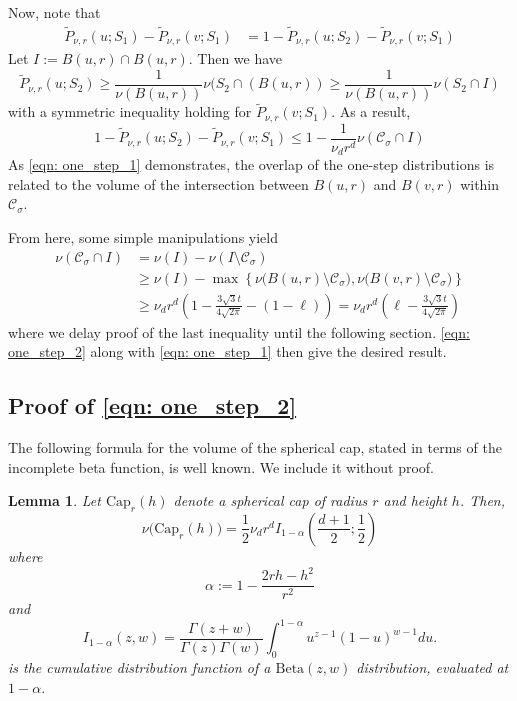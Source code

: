 \documentclass{article}
\newcommand{\set}[1]{\left\{#1\right\}}
\newcommand{\Cset}{\mathcal{C}}
\newcommand{\Csig}{\Cset_{\sigma}}
\newcommand{\1}{\mathbf{1}}
\theoremstyle{alden}
\theoremstyle{aldenthm}
\newtheorem{lemma}{Lemma}
\theoremstyle{remark}
\begin{document}
	Now, note that
	\begin{align*}
	\widetilde{P}_{\nu,r}(u; S_1) - \widetilde{P}_{\nu,r}(v; S_1) & = 1 - \widetilde{P}_{\nu,r}(u; S_2) - \widetilde{P}_{\nu,r}(v; S_1)
	\end{align*}
	Let $I := B(u,r) \cap B(u,r)$. Then we have
	\begin{equation*}
	\widetilde{P}_{\nu,r}(u; S_2) \geq \frac{1}{\nu(B(u,r))} \nu(S_2 \cap (B(u,r)) \geq \frac{1}{\nu(B(u,r))} \nu(S_2 \cap I)
	\end{equation*}
	with a symmetric inequality holding for $\widetilde{P}_{\nu,r}(v; S_1)$. As a result,
	\begin{equation}
	1 - \widetilde{P}_{\nu,r}(u; S_2) - \widetilde{P}_{\nu,r}(v; S_1) \leq 1 - \frac{1}{\nu_d r^d} \nu(\Csig \cap I) \label{eqn: one_step_1}
	\end{equation}
	As \eqref{eqn: one_step_1} demonstrates, the overlap of the one-step distributions is related to the volume of the intersection between $B(u,r)$ and $B(v,r)$ within $\Csig$.
	
	From here, some simple manipulations yield
	\begin{align}
	\nu(\Csig \cap I)  & = \nu(I) - \nu(I \setminus \Csig) \nonumber \\
	& \geq \nu(I) - \max \set{\nu\bigl(B(u,r) \setminus \Csig\bigr), \nu\bigl(B(v,r) \setminus \Csig\bigr)} \nonumber \\
	& \geq \nu_d r^d \left(1 - \frac{3 \sqrt{3} t}{4\sqrt{2\pi}} - (1 -\ell) \label{eqn: one_step_2} \right) = \nu_d r^d\left(\ell - \frac{3 \sqrt{3} t}{4\sqrt{2\pi}}\right)
	\end{align}
	where we delay proof of the last inequality until the following section. \eqref{eqn: one_step_2} along with \eqref{eqn: one_step_1} then give the desired result.

\subsection{Proof of \eqref{eqn: one_step_2}}
The following formula for the volume of the spherical cap, stated in terms of the incomplete beta function, is well known. We include it without proof. 
\begin{lemma}
	\label{lem: volume_of_spherical_cap}
	Let $\mathrm{Cap}_r(h)$ denote a spherical cap of radius $r$ and height $h$. Then, 
	\begin{equation*}
	\nu\bigl( \mathrm{Cap}_r(h)  \bigr) = \frac{1}{2} \nu_d r^d I_{1 - \alpha}(\frac{d + 1}{2}; \frac{1}{2})
	\end{equation*}
	where
	\begin{equation*}
	\alpha := 1 - \frac{2 r h - h^2}{r^2}
	\end{equation*}
	and
	\begin{equation*}
	I_{1 - \alpha}(z,w) = \frac{\Gamma(z + w)}{\Gamma(z) \Gamma(w)} \int_{0}^{1 - \alpha} u^{z - 1} (1 - u)^{w - 1} du.
	\end{equation*}
	is the cumulative distribution function of a $\mathrm{Beta}(z,w)$ distribution, evaluated at $1 - \alpha$. 
\end{lemma}
\end{document}
